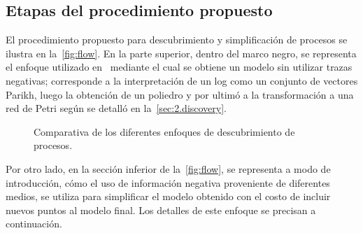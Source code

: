 \subsection{Etapas del procedimiento propuesto}
\label{sec:3.algodisco stages}

El procedimiento propuesto para descubrimiento y simplificación de procesos se ilustra en la~\autoref{fig:flow}.
En la parte superior, dentro del marco negro, se representa el enfoque utilizado en~\cite{CarmonaC14} 
mediante el cual se obtiene un modelo sin utilizar trazas negativas; corresponde a la interpretación
de un log como un conjunto de vectores Parikh, luego la obtención de un poliedro y por ultimó a la 
transformación a una red de Petri según se detalló en la~\autoref{sec:2.discovery}.

\begin{figure}[H]
    \begin{center}
    \caption{Comparativa de los diferentes enfoques de descubrimiento de procesos.}
    \label{fig:flow}
    \end{center}
\end{figure}

Por otro lado, en la sección inferior de la~\autoref{fig:flow}, se representa a modo de introducción,
cómo el uso de información negativa proveniente de diferentes medios, se utiliza para simplificar 
el modelo obtenido con el costo de incluir nuevos puntos al modelo final.
Los detalles de este enfoque se precisan a continuación.


